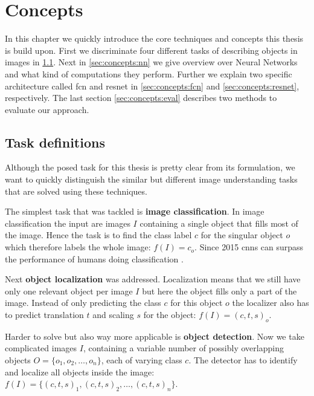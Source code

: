 %
\chapter{Concepts}
\label{sec:concepts}

In this chapter we quickly introduce the core techniques and concepts this thesis is build upon. First we discriminate four different tasks of describing objects in images in \ref{sec:concepts:tasks}. Next in \ref{sec:concepts:nn} we give overview over Neural Networks and what kind of computations they perform. Further we explain two specific architecture called \acrfull{fcn} and \acrfull{resnet} in \ref{sec:concepts:fcn} and \ref{sec:concepts:resnet}, respectively. The last section \ref{sec:concepts:eval} describes two methods to evaluate our approach.

\section{Task definitions}
\label{sec:concepts:tasks}
Although the posed task for this thesis is pretty clear from its formulation, we want to quickly distinguish the similar but different image understanding tasks that are solved using these techniques.

The simplest task that was tackled is \textbf{image classification}. In image classification the input are images $I$ containing a single object that fills most of the image. Hence the task is to find the class label $c$ for the singular object $o$ which therefore labels the whole image: $f(I) = c_o$. Since 2015 \glspl{cnn} can surpass the performance of humans doing classification \citep{he_delving_2015}.

Next \textbf{object localization} was addressed. Localization means that we still have only one relevant object per image $I$ but here the object fills only a part of the image. Instead of only predicting the class $c$ for this object $o$ the localizer also has to predict translation $t$ and scaling $s$ for the object: $f(I) = (c, t, s)_o$.

Harder to solve but also way more applicable is \textbf{object detection}. Now we take complicated images $I$, containing a variable number of possibly overlapping objects $O = \{o_1,o_2,\dotsc,o_n\}$, each of varying class $c$. The detector has to identify and localize all objects inside the image: $f(I) = \{(c, t, s)_1, (c, t, s)_2,\dotsc,(c, t, s)_n\}$.

